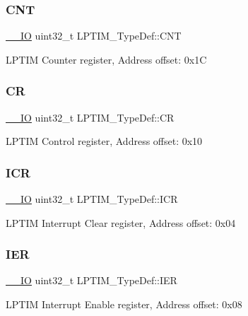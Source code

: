 \subsubsection{\texorpdfstring{CNT}{CNT}}
{\footnotesize\ttfamily \mbox{\hyperlink{core__sc300_8h_aec43007d9998a0a0e01faede4133d6be}{\+\_\+\+\_\+\+IO}} uint32\+\_\+t L\+P\+T\+I\+M\+\_\+\+Type\+Def\+::\+C\+NT}

L\+P\+T\+IM Counter register, Address offset\+: 0x1C \mbox{\label{struct_l_p_t_i_m___type_def_aa4900090e51a693ed07d4a90eb45ddf8}} 
\subsubsection{\texorpdfstring{CR}{CR}}
{\footnotesize\ttfamily \mbox{\hyperlink{core__sc300_8h_aec43007d9998a0a0e01faede4133d6be}{\+\_\+\+\_\+\+IO}} uint32\+\_\+t L\+P\+T\+I\+M\+\_\+\+Type\+Def\+::\+CR}

L\+P\+T\+IM Control register, Address offset\+: 0x10 \mbox{\label{struct_l_p_t_i_m___type_def_a09774178fdd5412dd8f4539f431b15c9}} 
\subsubsection{\texorpdfstring{ICR}{ICR}}
{\footnotesize\ttfamily \mbox{\hyperlink{core__sc300_8h_aec43007d9998a0a0e01faede4133d6be}{\+\_\+\+\_\+\+IO}} uint32\+\_\+t L\+P\+T\+I\+M\+\_\+\+Type\+Def\+::\+I\+CR}

L\+P\+T\+IM Interrupt Clear register, Address offset\+: 0x04 \mbox{\label{struct_l_p_t_i_m___type_def_a58d1ea360d85b8d4f13e4f6bba594ea7}} 
\subsubsection{\texorpdfstring{IER}{IER}}
{\footnotesize\ttfamily \mbox{\hyperlink{core__sc300_8h_aec43007d9998a0a0e01faede4133d6be}{\+\_\+\+\_\+\+IO}} uint32\+\_\+t L\+P\+T\+I\+M\+\_\+\+Type\+Def\+::\+I\+ER}

L\+P\+T\+IM Interrupt Enable register, Address offset\+: 0x08 \mbox{\label{struct_l_p_t_i_m___type_def_a5b270971af377ca8387e65bb9267dd0e}} 
